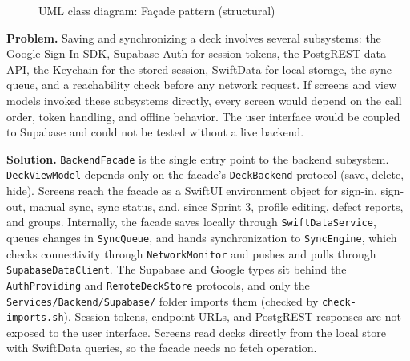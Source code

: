 \documentclass[12pt,letterpaper]{article}
\begin{document}
\begin{figure}[!htbp]
{}
\caption{UML class diagram: Fa\c{c}ade pattern (structural)}
\label{fig:facade}
\end{figure}

\textbf{Problem.} Saving and synchronizing a deck involves several subsystems: the
Google Sign-In SDK, Supabase Auth for session tokens, the PostgREST data API, the
Keychain for the stored session, SwiftData for local storage, the sync queue, and a
reachability check before any network request. If screens and view models invoked these
subsystems directly, every screen would depend on the call order, token handling, and
offline behavior. The user interface would be coupled to Supabase and could not be
tested without a live backend.

\textbf{Solution.} \texttt{BackendFacade} is the single entry point to the backend
subsystem. \texttt{DeckViewModel} depends only on the facade's \texttt{DeckBackend}
protocol (save, delete, hide). Screens reach the facade as a SwiftUI environment object
for sign-in, sign-out, manual sync, sync status, and, since Sprint 3, profile editing,
defect reports, and groups. Internally, the facade saves
locally through \texttt{SwiftDataService}, queues changes in \texttt{SyncQueue}, and
hands synchronization to \texttt{SyncEngine}, which checks connectivity through
\texttt{NetworkMonitor} and pushes and pulls through \texttt{SupabaseDataClient}. The
Supabase and Google types sit behind the \texttt{AuthProviding} and
\texttt{RemoteDeckStore} protocols, and only the \texttt{Services/\allowbreak Backend/\allowbreak Supabase/}
folder imports them (checked by \texttt{check-imports.sh}). Session tokens, endpoint
URLs, and PostgREST responses are not exposed to the user interface. Screens read decks
directly from the local store with SwiftData queries, so the facade needs no fetch
operation.
\end{document}
